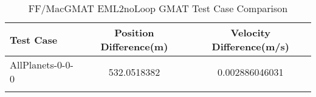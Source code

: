 \begin{table}[htbp!]
\centering
\caption{ FF/MacGMAT EML2noLoop GMAT Test Case Comparison}
      \begin{tabular}{lcc}
      \hline\hline
          Test Case & Position Difference(m) & Velocity Difference(m/s) \\
         \hline
         AllPlanets-0-0-0 & 532.0518382 & 0.002886046031 \\
      \hline\hline
      \label{Table: EML2noLoop GMAT Table} 
\end{tabular}
\end{table}
